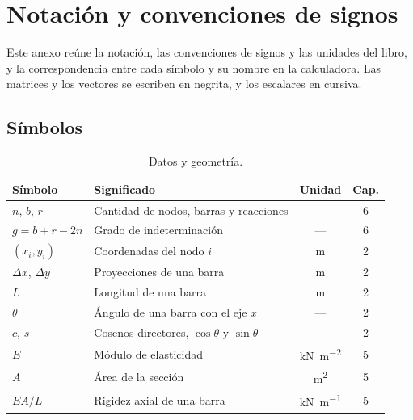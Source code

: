 \chapter{Notación y convenciones de signos}\label{cap:notacion}

Este anexo reúne la notación, las convenciones de signos y las unidades del
libro, y la correspondencia entre cada símbolo y su nombre en la calculadora.
Las matrices y los vectores se escriben en negrita, y los escalares en
cursiva.

\section{Símbolos}\label{sec:e_simbolos}

\begin{table}[ht]
  \centering
  \caption{Datos y geometría.}
  \label{tab:e_geometria}
  \small
  \begin{tabular}{@{}llcc@{}}
    \toprule
    Símbolo & Significado & Unidad & Cap. \\
    \midrule
    $n$, $b$, $r$ & Cantidad de nodos, barras y reacciones & --- & 6 \\
    $g = b + r - 2n$ & Grado de indeterminación & --- & 6 \\
    $(x_i, y_i)$ & Coordenadas del nodo $i$ & \si{\metre} & 2 \\
    $\Delta x$, $\Delta y$ & Proyecciones de una barra & \si{\metre} & 2 \\
    $L$ & Longitud de una barra & \si{\metre} & 2 \\
    $\theta$ & Ángulo de una barra con el eje $x$ & --- & 2 \\
    $c$, $s$ & Cosenos directores, $\cos\theta$ y $\sin\theta$ & --- & 2 \\
    $E$ & Módulo de elasticidad & \si{\kilo\newton\per\metre\squared} & 5 \\
    $A$ & Área de la sección & \si{\metre\squared} & 5 \\
    $EA/L$ & Rigidez axial de una barra & \si{\kilo\newton\per\metre} & 5 \\
    \bottomrule
  \end{tabular}
\end{table}

